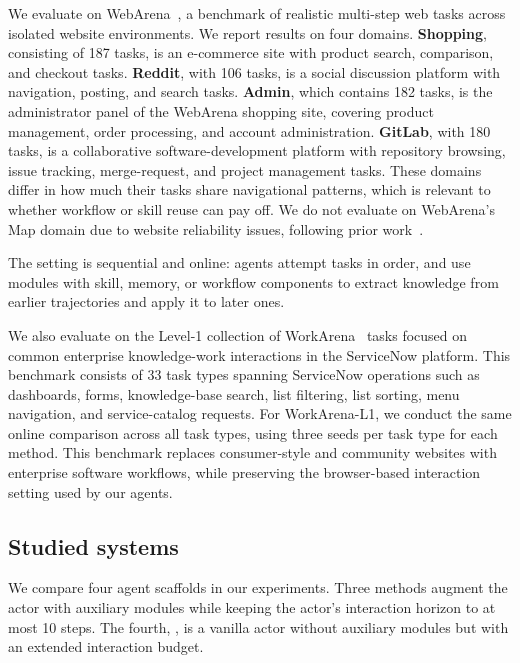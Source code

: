 We evaluate on WebArena~\citep{zhou-etal-2024-webarena}, a benchmark of realistic multi-step web tasks across isolated website environments.
We report results on four domains.
\textbf{Shopping}, consisting of 187 tasks, is an e-commerce site with product search, comparison, and checkout tasks.
\textbf{Reddit}, with 106 tasks, is a social discussion platform with navigation, posting, and search tasks.
\textbf{Admin}, which contains 182 tasks, is the administrator panel of the WebArena shopping site, covering product management, order processing, and account administration.
\textbf{GitLab}, with 180 tasks, is a collaborative software-development platform with repository browsing, issue tracking, merge-request, and project management tasks.
These domains differ in how much their tasks share navigational patterns, which is relevant to whether workflow or skill reuse can pay off.
We do not evaluate on WebArena's Map domain due to website reliability issues, following prior work~\citep{ouyang-etal-2025-reasoningbank,miyai-etal-2025-webchorearena}.

The setting is sequential and online: agents attempt tasks in order, and use modules with skill, memory, or workflow components to extract knowledge from earlier trajectories and apply it to later ones.

We also evaluate on the Level-1 collection of WorkArena~\citep{drouin-etal-2024-workarena} tasks focused on common enterprise knowledge-work interactions in the ServiceNow platform.
This benchmark consists of 33 task types spanning ServiceNow operations such as dashboards, forms, knowledge-base search, list filtering, list sorting, menu navigation, and service-catalog requests.
For WorkArena-L1, we conduct the same online comparison across all task types, using three seeds per task type for each method.
This benchmark replaces consumer-style and community websites with enterprise software workflows, while preserving the browser-based interaction setting used by our agents.

\subsection{Studied systems}

We compare four agent scaffolds in our experiments. Three methods augment the actor with auxiliary modules while keeping the actor's interaction horizon to at most 10 steps. The fourth, \budgetactor{}, is a vanilla actor without auxiliary modules but with an extended interaction budget.

